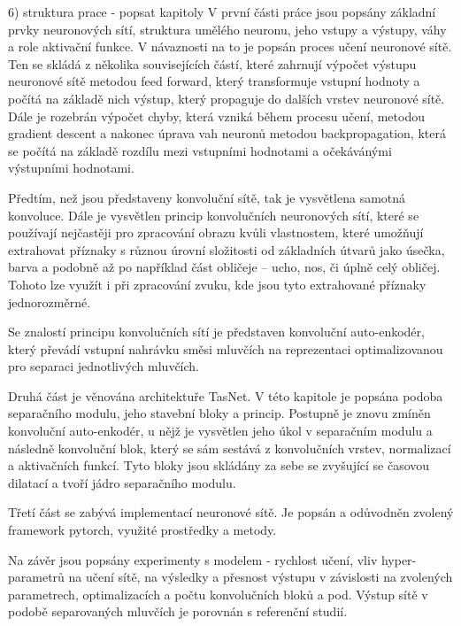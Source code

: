6) struktura prace - popsat kapitoly
V první části práce jsou popsány základní prvky neuronových sítí, struktura umělého neuronu, jeho vstupy a výstupy, váhy a role aktivační funkce. V návaznosti na to je popsán proces učení neuronové sítě. Ten se skládá z několika souvisejících částí, které zahrnují výpočet výstupu neuronové sítě metodou feed forward, který transformuje vstupní hodnoty a počítá na základě nich výstup, který propaguje do dalších vrstev neuronové sítě. Dále je rozebrán výpočet chyby, která vzniká během procesu učení, metodou gradient descent a nakonec úprava vah neuronů metodou backpropagation, která se počítá na základě rozdílu mezi vstupními hodnotami a očekávánými výstupními hodnotami.

Předtím, než jsou představeny konvoluční sítě, tak je vysvětlena samotná konvoluce.
Dále je vysvětlen princip konvolučních neuronových sítí, které se používají nejčastěji pro zpracování obrazu kvůli vlastnostem, které umožňují extrahovat příznaky s různou úrovní složitosti od základních útvarů jako úsečka, barva a podobně až po například část obličeje -- ucho, nos, či úplně celý obličej. Tohoto lze využít i při zpracování zvuku, kde jsou tyto extrahované příznaky jednorozměrné.

Se znalostí principu konvolučních sítí je představen konvoluční auto-enkodér, který převádí vstupní nahrávku směsi mluvčích na reprezentaci optimalizovanou pro separaci jednotlivých mluvčích.

Druhá část je věnována architektuře TasNet. V této kapitole je popsána podoba separačního modulu, jeho stavební bloky a princip. Postupně je znovu zmíněn konvoluční auto-enkodér, u nějž je vysvětlen jeho úkol v separačním modulu a následně konvoluční blok, který se sám sestává z konvolučních vrstev, normalizací a aktivačních funkcí. Tyto bloky jsou skládány za sebe se zvyšující se časovou dilatací a tvoří jádro separačního modulu.

Třetí část se zabývá implementací neuronové sítě. Je popsán a odůvodněn zvolený framework pytorch, využité prostředky a metody.

Na závěr jsou popsány experimenty s modelem - rychlost učení, vliv hyper-parametrů na učení sítě, na výsledky a přesnost výstupu v závislosti na zvolených parametrech, optimalizacích a počtu konvolučních bloků a pod. Výstup sítě v podobě separovaných mluvčích je porovnán s referenční studií.

